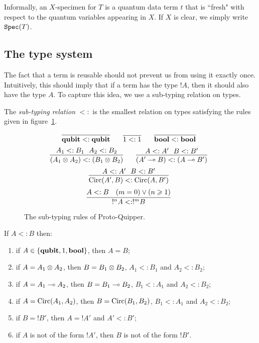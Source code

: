 \documentclass[twoside]{article}
\begin{document}

Informally, an $X$-specimen for $T$ is a quantum data term $t$ that is 
``fresh" with respect to the quantum variables appearing in $X$.
If $X$ is clear, we simply write $\texttt{Spec} (T)$.


\subsection{The type system}

The fact that a term is reusable should not prevent us from 
using it exactly once. Intuitively, this should imply that if a 
term has the type $!A$, then it should also have the type $A$. 
To capture this idea, we use a sub-typing relation on types.

\begin{definition}
The \emph{sub-typing relation} $<:$ is the smallest relation on 
types satisfying the rules given in 
figure~\hyperref[subtyping_congruences]{\ref*{subtyping_congruences}}.
\end{definition}

\begin{figure}[!ht]
\begin{mdframed}
\[
  \infer[]{\qubit <: \qubit}{}
~~~~
  \infer[]{1 <: 1}{}
~~~~
  \infer[]{\bool <: \bool}{}
\]
\[
  \infer[]{ (A_1\x A_2) <:  (B_1 \x B_2)}{A_1<:B_1~~A_2<:B_2}
~~~~
  \infer[]{ (A'\loli B) <: (A\loli B')}{A<:A'~~B<:B'}
\]
\[
  \infer[]{ \Circ(A', B) <:  \Circ(A, B')}{A<:A'~~B<:B'}
\]
\[
  \infer[]{ !^nA <: !^mB}{
    A<:B
    &
    (m=0)\vee (n\geq 1)
  }
\]
%
\end{mdframed}
\caption{The sub-typing rules of Proto-Quipper.}
\label{subtyping_congruences}
\end{figure}

\begin{remark}
\label{subtyping_shape}
If $A<:B$ then:
\begin{enumerate}
  \item if $A\in\{\textrm{\bf qubit}, 1, \textrm{\bf bool}\}$, then $A=B$;
  \item if $A=A_1\otimes A_2$, then $B=B_1\otimes B_2$, 
  $A_1<:B_1$ and $A_2<:B_2$;
  \item if $A=A_1\multimap A_2$, then $B=B_1\multimap B_2$, 
  $B_1<:A_1$ and $A_2<:B_2$;
  \item if $A=\mathop{\textrm{Circ}}\nolimits(A_1, A_2)$, then $B=\mathop{\textrm{Circ}}\nolimits(B_1,B_2)$, 
  $B_1<:A_1$ and $A_2<:B_2$;
  \item if $B=!B'$, then $A=!A'$ and $A'<:B'$;\label{subtype_bang}
  \item if $A$ is not of the form $!A'$, then $B$ is not 
  of the form $!B'$.
\end{enumerate}
\end{remark}
\end{document}

